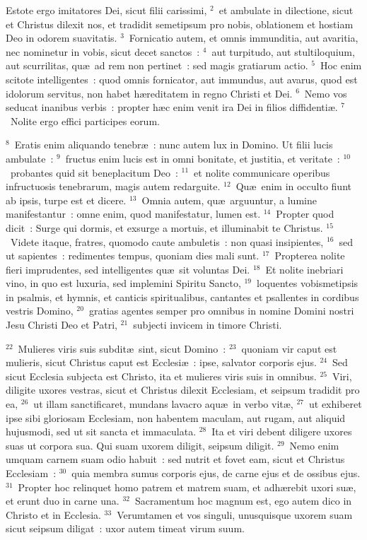 \lettrine[lines=3,image=true,loversize=0.05,lraise=-0.03]{E}{}stote ergo imitatores Dei, sicut filii carissimi,
${}^{2}$~et ambulate in dilectione, sicut et Christus dilexit nos, et tradidit semetipsum pro nobis, oblationem et hostiam Deo in odorem suavitatis.
${}^{3}$~Fornicatio autem, et omnis immunditia, aut avaritia, nec nominetur in vobis, sicut decet sanctos~:
${}^{4}$~aut turpitudo, aut stultiloquium, aut scurrilitas, qu\ae\ ad rem non pertinet~: sed magis gratiarum actio.
${}^{5}$~Hoc enim scitote intelligentes~: quod omnis fornicator, aut immundus, aut avarus, quod est idolorum servitus, non habet h\ae reditatem in regno Christi et Dei.
${}^{6}$~Nemo vos seducat inanibus verbis~: propter h\ae c enim venit ira Dei in filios diffidenti\ae .
${}^{7}$~Nolite ergo effici participes eorum.


${}^{8}$~Eratis enim aliquando tenebr\ae~: nunc autem lux in Domino. Ut filii lucis ambulate~:
${}^{9}$~fructus enim lucis est in omni bonitate, et justitia, et veritate~:
${}^{10}$~probantes quid sit beneplacitum Deo~:
${}^{11}$~et nolite communicare operibus infructuosis tenebrarum, magis autem redarguite.
${}^{12}$~Qu\ae\ enim in occulto fiunt ab ipsis, turpe est et dicere.
${}^{13}$~Omnia autem, qu\ae\ arguuntur, a lumine manifestantur~: omne enim, quod manifestatur, lumen est.
${}^{14}$~Propter quod dicit~: Surge qui dormis, et exsurge a mortuis, et illuminabit te Christus.
${}^{15}$~Videte itaque, fratres, quomodo caute ambuletis~: non quasi insipientes,
${}^{16}$~sed ut sapientes~: redimentes tempus, quoniam dies mali sunt.
${}^{17}$~Propterea nolite fieri imprudentes, sed intelligentes qu\ae\ sit voluntas Dei.
${}^{18}$~Et nolite inebriari vino, in quo est luxuria, sed implemini Spiritu Sancto,
${}^{19}$~loquentes vobismetipsis in psalmis, et hymnis, et canticis spiritualibus, cantantes et psallentes in cordibus vestris Domino,
${}^{20}$~gratias agentes semper pro omnibus in nomine Domini nostri Jesu Christi Deo et Patri,
${}^{21}$~subjecti invicem in timore Christi.


${}^{22}$~Mulieres viris suis subdit\ae\ sint, sicut Domino~:
${}^{23}$~quoniam vir caput est mulieris, sicut Christus caput est Ecclesi\ae~: ipse, salvator corporis ejus.
${}^{24}$~Sed sicut Ecclesia subjecta est Christo, ita et mulieres viris suis in omnibus.
${}^{25}$~Viri, diligite uxores vestras, sicut et Christus dilexit Ecclesiam, et seipsum tradidit pro ea,
${}^{26}$~ut illam sanctificaret, mundans lavacro aqu\ae\ in verbo vit\ae ,
${}^{27}$~ut exhiberet ipse sibi gloriosam Ecclesiam, non habentem maculam, aut rugam, aut aliquid hujusmodi, sed ut sit sancta et immaculata.
${}^{28}$~Ita et viri debent diligere uxores suas ut corpora sua. Qui suam uxorem diligit, seipsum diligit.
${}^{29}$~Nemo enim umquam carnem suam odio habuit~: sed nutrit et fovet eam, sicut et Christus Ecclesiam~:
${}^{30}$~quia membra sumus corporis ejus, de carne ejus et de ossibus ejus.
${}^{31}$~Propter hoc relinquet homo patrem et matrem suam, et adh\ae rebit uxori su\ae , et erunt duo in carne una.
${}^{32}$~Sacramentum hoc magnum est, ego autem dico in Christo et in Ecclesia.
${}^{33}$~Verumtamen et vos singuli, unusquisque uxorem suam sicut seipsum diligat~: uxor autem timeat virum suum.

